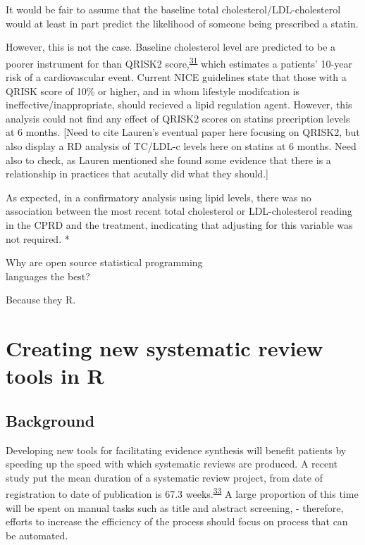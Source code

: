 \documentclass[a4paper, twoside]{templates/ociamthesis}
\begin{document}
It would be fair to assume that the baseline total cholesterol/LDL-cholesterol would at least in part predict the likelihood of someone being prescribed a statin.

However, this is not the case. Baseline cholesterol level are predicted to be a poorer instrument for than QRISK2 score,\textsuperscript{\protect\hyperlink{ref-hippisley-cox2008}{31}} which estimates a patients' 10-year risk of a cardiovascular event. Current NICE guidelines state that those with a QRISK score of 10\% or higher, and in whom lifestyle modifcation is ineffective/inappropriate, should recieved a lipid regulation agent. However, this analysis could not find any effect of QRISK2 scores on statins precription levels at 6 months. {[}Need to cite Lauren's eventual paper here focusing on QRISK2, but also display a RD analysis of TC/LDL-c levels here on statins at 6 months. Need also to check, as Lauren mentioned she found some evidence that there is a relationship in practices that acutally did what they should.{]}

As expected, in a confirmatory analysis using lipid levels, there was no association between the most recent total cholesterol or LDL-cholesterol reading in the CPRD and the treatment, incdicating that adjusting for this variable was not required. *

\begin{savequote}
Why are open source statistical programming\\
languages the best?

Because they R.
\end{savequote}



\hypertarget{sys-rev-tools-heading}{%
\chapter{Creating new systematic review tools in R}\label{sys-rev-tools-heading}}

\minitoc 

\hypertarget{background}{%
\section{Background}\label{background}}

Developing new tools for facilitating evidence synthesis will benefit patients by speeding up the speed with which systematic reviews are produced. A recent study put the mean duration of a systematic review project, from date of registration to date of publication is 67.3 weeks.\textsuperscript{\protect\hyperlink{ref-borah2017}{33}} A large proportion of this time will be spent on manual tasks such as title and abstract screening, - therefore, efforts to increase the efficiency of the process should focus on process that can be automated.
\end{document}
